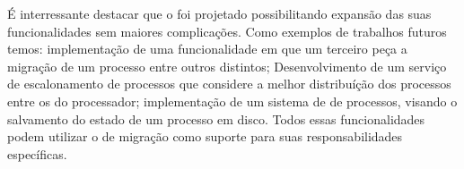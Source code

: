 É interressante destacar que o \daemon foi projetado possibilitando expansão das suas funcionalidades sem maiores complicações. Como exemplos de trabalhos futuros temos: implementação de uma funcionalidade em que um terceiro \cluster peça a migração de um processo entre outros \clusters distintos; Desenvolvimento de um serviço de escalonamento de processos que considere a melhor distribuíção dos processos entre os \clusters do processador; implementação de um sistema de \checkpointing de processos, visando o salvamento do estado de um processo em disco. Todos essas funcionalidades podem utilizar o \daemon de migração como suporte para suas responsabilidades específicas.